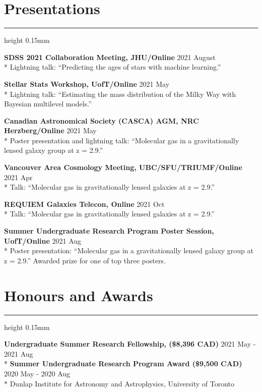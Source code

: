 \documentclass[11pt]{extarticle}
\newcommand{\hrulesp}[1]{%
  \vspace{-1.5mm}
  \hrule height 0.15mm
  \vspace{#1}
}
\begin{document}
\vspace{-4mm}
\section*{Presentations}
\hrulesp{2mm}

\textbf{SDSS 2021 Collaboration Meeting, JHU/Online} \hfill 2021 August \\*
Lightning talk: ``Predicting the ages of stars with machine learning.''

\textbf{Stellar Stats Workshop, UofT/Online} \hfill 2021 May \\*
Lightning talk: ``Estimating the mass distribution of the Milky Way with Bayesian multilevel models.''

\textbf{Canadian Astronomical Society (CASCA) AGM, NRC Herzberg/Online} \hfill 2021 May \\*
Poster presentation and lightning talk: ``Molecular gas in a gravitationally lensed galaxy group at z = 2.9.''

\textbf{Vancouver Area Cosmology Meeting, UBC/SFU/TRIUMF/Online} \hfill 2021 Apr \\*
Talk: ``Molecular gas in gravitationally lensed galaxies at z = 2.9.''

\textbf{REQUIEM Galaxies Telecon, Online} \hfill 2021 Oct \\*
Talk: ``Molecular gas in gravitationally lensed galaxies at z = 2.9.''

\textbf{Summer Undergraduate Research Program Poster Session, UofT/Online} \hfill 2021 Aug \\*
Poster presentation: ``Molecular gas in a gravitationally lensed galaxy group at z = 2.9.'' Awarded prize for one of top three posters.


\vspace{-4mm}
\section*{Honours and Awards}
\hrulesp{2mm}

\textbf{Undergraduate Summer Research Fellowship, (\$8,396 CAD)} \hfill 2021 May - 2021 Aug \\*
\textbf{Summer Undergraduate Research Program Award (\$9,500 CAD)} \hfill 2020 May - 2020 Aug \\*
Dunlap Institute for Astronomy and Astrophysics, University of Toronto
\end{document}
